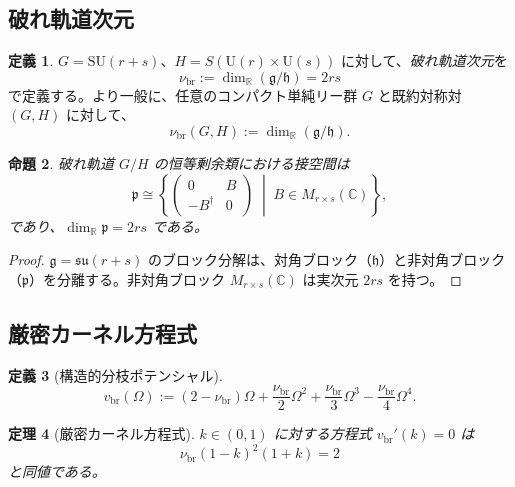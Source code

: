 \documentclass[12pt]{article}
\theoremstyle{plain}
\newtheorem{theorem}{定理}[section]
\newtheorem{proposition}[theorem]{命題}
\theoremstyle{definition}
\newtheorem{definition}[theorem]{定義}
\numberwithin{equation}{section}
\newcommand{\R}{\mathbb{R}}
\newcommand{\C}{\mathbb{C}}
\newcommand{\fg}{\mathfrak{g}}
\newcommand{\fh}{\mathfrak{h}}
\newcommand{\fp}{\mathfrak{p}}
\newcommand{\br}{\mathrm{br}}
\begin{document}
\subsection{破れ軌道次元}

\begin{definition}
$G=\mathrm{SU}(r+s)$、$H=S(\mathrm{U}(r)\times\mathrm{U}(s))$ に対して、\emph{破れ軌道次元}を
\begin{equation}
\nu_{\br} := \dim_\R(\fg/\fh) = 2rs
\end{equation}
で定義する。より一般に、任意のコンパクト単純リー群 $G$ と既約対称対 $(G,H)$ に対して、
\begin{equation}
\nu_{\br}(G,H) := \dim_\R(\fg/\fh).
\end{equation}
\end{definition}

\begin{proposition}\label{prop:brokenorbit}
破れ軌道 $G/H$ の恒等剰余類における接空間は
\begin{equation}
\fp \cong \left\{
\begin{pmatrix} 0 & B \\ -B^\dagger & 0 \end{pmatrix}
\;\middle|\; B\in M_{r\times s}(\C)
\right\},
\end{equation}
であり、$\dim_\R\fp=2rs$ である。
\end{proposition}

\begin{proof}
$\fg=\mathfrak{su}(r+s)$ のブロック分解は、対角ブロック（$\fh$）と非対角ブロック（$\fp$）を分離する。非対角ブロック $M_{r\times s}(\C)$ は実次元 $2rs$ を持つ。
\end{proof}

\subsection{厳密カーネル方程式}

\begin{definition}[構造的分枝ポテンシャル]
\begin{equation}
v_{\br}(\Omega) := (2-\nu_{\br})\Omega + \frac{\nu_{\br}}{2}\Omega^2 + \frac{\nu_{\br}}{3}\Omega^3 - \frac{\nu_{\br}}{4}\Omega^4.
\end{equation}
\end{definition}

\begin{theorem}[厳密カーネル方程式]\label{thm:strictkernel}
$k\in(0,1)$ に対する方程式 $v_{\br}'(k)=0$ は
\begin{equation}
\boxed{\nu_{\br}(1-k)^2(1+k) = 2}
\end{equation}
と同値である。
\end{theorem}
\end{document}
